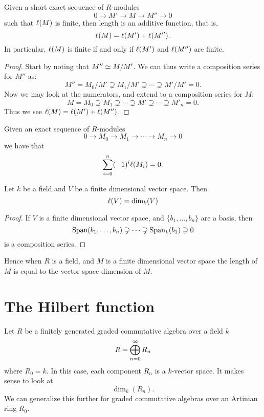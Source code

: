 \documentclass{ximera}
\begin{document}
\begin{proposition}\label{P:AL}
  Given a short exact sequence of $R$-modules
  \[
  0\to M' \to M\to M'' \to 0
  \]
  such that $\ell(M)$ is finite, then length is an additive function, that is,
  \[
  \ell(M) = \ell(M')+\ell(M'').
  \]
  In particular, $\ell(M)$ is finite if and only if $\ell(M')$ and
  $\ell(M'')$ are finite.
  \begin{proof}
    Start by noting that $M''\simeq M/M'$. We can thus write a
    composition series for $M''$ as:
    \[
    M'' = M_0/M' \supsetneq M_1/M' \supsetneq \cdots \supsetneq M'/M'  = 0.
    \]
    Now we may look at the numerators, and extend to a composition
    series for $M$:
    \[
    M = M_0 \supsetneq M_1 \supsetneq \cdots \supsetneq M' \supsetneq \cdots \supsetneq M'_n = 0.
    \]
    Thus we see $\ell(M) = \ell(M')+\ell(M'')$.
  \end{proof}
\end{proposition}

\begin{corollary}\label{C:Lles}
  Given an exact sequence of $R$-modules
  \[
  0 \to M_0\to M_1\to \cdots \to M_n \to 0
  \]
  we have that
  \[
  \sum_{i=0}^n (-1)^i \ell(M_i) = 0.
  \]
\end{corollary}



\begin{proposition}
  Let $k$ be a field and $V$ be a finite dimensional vector
  space. Then
  \[
  \ell(V) = \dim_k(V)
  \]
  \begin{proof}
    If $V$ is a finite dimensional vector space, and
    $\{b_1,\dots,b_n\}$ are a basis, then
    \[
    \operatorname{Span}(b_1,\dots,b_n) \supsetneq \dots \supsetneq \operatorname{Span}_k(b_1) \supsetneq 0
    \]
    is a composition series.
  \end{proof}
\end{proposition}


Hence when $R$ is a field, and $M$ is a finite dimensional vector
space the length of $M$ is equal to the vector space dimension of $M$.




\section{The Hilbert function}

Let $R$ be a finitely generated graded commutative algebra over a
field $k$
\[
R = \bigoplus_{n=0}^\infty R_n
\]
where $R_0 = k$.  In this case, each component $R_n$ is a $k$-vector
space. It makes sense to look at
\[
\dim_k(R_n).
\]
We can generalize this further for graded commutative algebras over an
Artinian ring $R_0$.
\end{document}
